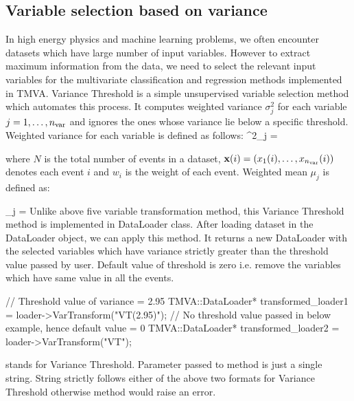\subsection{Variable selection based on variance}
\label{sec:varianceThreshold}
In high energy physics and machine learning problems, we often encounter datasets which have large number of input variables. However to extract maximum information from the data, we need to select the relevant input variables for the multivariate classification and regression methods implemented in TMVA. Variance Threshold is a simple unsupervised variable selection method which automates this process.
It computes weighted variance $\sigma^2_{j}$ for each variable $j = 1,\dots,{{n_\text{var}}}$ and ignores the ones whose variance lie below a specific threshold. Weighted variance for each variable is defined as follows:
\beq
\label{eq:variancecalculation}
\sigma^2_{j} = 
\eeq

where $N$ is the total number of events in a dataset, ${\bf x}(i)=(x_1(i),\dots,x_{{n_\text{var}}}(i))$ denotes each event $i$ and $w_i$ is the weight of each event. Weighted mean $\mu_{j}$ is defined as: 

\beq
\label{eq:meanecalculation}
\mu_j = 
\eeq
Unlike above five variable transformation method, this Variance Threshold method is implemented in DataLoader class. After loading dataset in the DataLoader object, we can apply this method. It returns a new DataLoader with the selected variables which have variance strictly greater than the threshold value passed by user. Default value of threshold is zero i.e. remove the variables which have same value in all the events. 

\begin{codeexample}
\begin{tmvacode}
// Threshold value of variance = 2.95
TMVA::DataLoader* transformed_loader1 = loader->VarTransform("VT(2.95)");
// No threshold value passed in below example, hence default value = 0
TMVA::DataLoader* transformed_loader2 = loader->VarTransform("VT");
\end{tmvacode}
\caption[.]{\codeexampleCaptionSize {} stands for Variance Threshold. Parameter passed to  method is just a single string. String strictly follows either of the above two formats for Variance Threshold otherwise method would raise an error. 
}
\end{codeexample}


